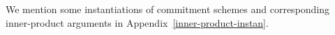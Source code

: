 We mention some instantiations of  commitment schemes and corresponding inner-product arguments in Appendix~\ref{inner-product-instan}. 


 
%
